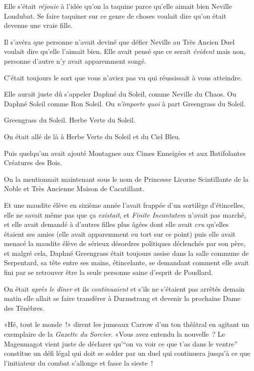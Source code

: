 Elle s'était \emph{réjouie} à l'idée qu'on la taquine parce qu'elle aimait bien Neville Londubat. Se faire taquiner sur ce genre de choses voulait dire qu'on était devenue une vraie fille.

Il s'avéra que personne n'avait deviné que défier Neville au Très Ancien Duel voulait dire qu'elle l'aimait bien. Elle avait pensé que ce serait \emph{évident} mais non, personne d'autre n'y avait apparemment songé.

C'était toujours le sort que vous n'aviez pas vu qui réussissait à vous atteindre.

Elle aurait juste dû s'appeler Daphné du Soleil, comme Neville du Chaos. Ou Daphné Soleil comme Ron Soleil. Ou \emph{n'importe quoi} à part Greengrass du Soleil.

Greengrass du Soleil. Herbe Verte du Soleil.

On était allé de là à Herbe Verte du Soleil et du Ciel Bleu.

Puis quelqu'un avait ajouté Montagnes aux Cimes Enneigées et aux Batifolantes Créatures des Bois.

On la mentionnait maintenant sous le nom de Princesse Licorne Scintillante de la Noble et Très Ancienne Maison de Cacatillant.

Et une maudite élève en sixième année l'avait frappée d'un sortilège d'étincelles, elle ne savait même pas que ça \emph{existait}, et \emph{Finite Incantatem} n'avait pas marché, et elle avait demandé à d'autres filles plus âgées dont elle avait \emph{cru} qu'elles étaient ses amies (elle avait apparemment eu tort sur ce point) puis elle avait menacé la maudite élève de sérieux désordres politiques déclenchés par son père, et malgré cela, Daphné Greengrass était toujours assise dans la salle commune de Serpentard, sa tête entre ses mains, étincelante, se demandant comment elle avait fini par se retrouver être la seule personne saine d'esprit de Poudlard.

On était \emph{après le dîner} et ils \emph{continuaient} et s'ils ne s'étaient pas arrêtés demain matin elle allait se faire transférer à Durmstrang et devenir la prochaine Dame des Ténèbres.

«Hé, tout le monde~!» dirent les jumeaux Carrow d'un ton théâtral en agitant un exemplaire de la \emph{Gazette du Sorcier}. «Vous avez entendu la nouvelle~? Le Magenmagot vient juste de déclarer qu'“on va voir ce que t'as dans le ventre” constitue un défi légal qui doit se solder par un duel qui continuera jusqu'à ce que l'initiateur du combat s'allonge et fasse la sieste~!

